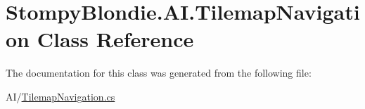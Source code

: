 \hypertarget{class_stompy_blondie_1_1_a_i_1_1_tilemap_navigation}{}\section{Stompy\+Blondie.\+A\+I.\+Tilemap\+Navigation Class Reference}
\label{class_stompy_blondie_1_1_a_i_1_1_tilemap_navigation}


The documentation for this class was generated from the following file\+:\begin{DoxyCompactItemize}
\item 
A\+I/\mbox{\hyperlink{_tilemap_navigation_8cs}{Tilemap\+Navigation.\+cs}}\end{DoxyCompactItemize}
